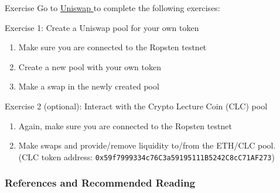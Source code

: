 \documentclass[]{beamer}
\begin{document}
\begin{frame}{Exercise}
	Go to \href{https://app.uniswap.org/}{Uniswap \link} to complete the following exercises:
	\vspace{.5cm}

	\begin{exercise}{Exercise 1: Create a Uniswap pool for your own token}
		\begin{enumerate}
			\item Make sure you are connected to the Ropsten testnet
			\item Create a new pool with your own token
			\item Make a swap in the newly created pool
		\end{enumerate}
	\end{exercise}
	\vspace{.5cm}
	
	
	\begin{exercise}{Exercise 2 (optional): Interact with the Crypto Lecture Coin (CLC) pool}
		\begin{enumerate}
			\item Again, make sure you are connected to the Ropsten testnet
			\item Make swaps and provide/remove liquidity to/from the ETH/CLC pool.\\ (CLC token address: \texttt{0x59f7999334c76C3a59195111B5242C8cC71AF273})
		\end{enumerate}
	\end{exercise}
\end{frame}



\begin{frame}%
\frametitle{References and Recommended Reading}
\nocite{FS:21}
		
		
	
\end{frame}
\end{document}

